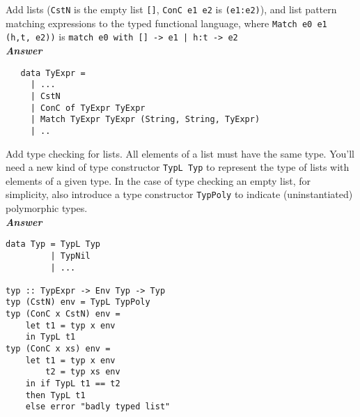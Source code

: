 \documentclass[a4paper]{article}
\begin{document}
\begin{exercise}
  Add lists (\texttt{CstN} is the empty list \texttt{[]},
  \texttt{ConC e1 e2} is \texttt{(e1:e2)}), and list pattern matching
  expressions to the typed functional language, where
  \texttt{Match e0 e1 (h,t, e2))} is \texttt{match e0 with [] -> e1
    | h:t -> e2}\\

\noindent
\textbf{\emph{Answer}} 
{\codesetup\begin{verbatim}
   data TyExpr = 
     | ...
     | CstN
     | ConC of TyExpr TyExpr
     | Match TyExpr TyExpr (String, String, TyExpr)
     | ..
\end{verbatim}}

\end{exercise}

\begin{exercise}
  Add type checking for lists.  All elements of a list must have the
  same type.  You'll need a new kind of type constructor \texttt{TypL Typ} to
  represent the type of lists with elements of a given type. In the case of type checking an empty list, for simplicity, also introduce a type constructor \texttt{TypPoly} to indicate (uninstantiated) polymorphic types.\\
  
\noindent
\textbf{\emph{Answer}} 
{\codesetup\begin{verbatim}
data Typ = TypL Typ
         | TypNil
         | ...
         
typ :: TypExpr -> Env Typ -> Typ
typ (CstN) env = TypL TypPoly
typ (ConC x CstN) env = 
    let t1 = typ x env
    in TypL t1
typ (ConC x xs) env = 
    let t1 = typ x env
        t2 = typ xs env
    in if TypL t1 == t2
    then TypL t1
    else error "badly typed list"
\end{verbatim}}
\end{exercise}
\end{document}
